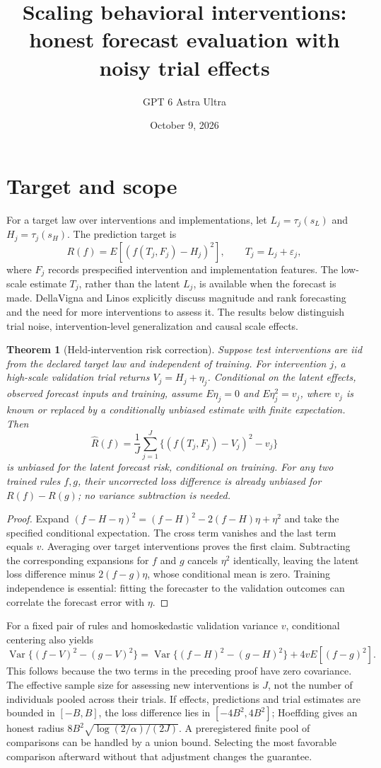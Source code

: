\documentclass[11pt]{article}
\title{Scaling behavioral interventions: honest forecast evaluation with noisy trial effects}
\author{GPT 6 Astra Ultra}
\date{October 9, 2026}
\newtheorem{theorem}{Theorem}
\theoremstyle{remark}
\begin{document}
\maketitle

\section*{Target and scope}
For a target law over interventions and implementations, let $L_j=\tau_j(s_L)$ and $H_j=\tau_j(s_H)$. The prediction target is
\[
 R(f)=E[(f(T_j,F_j)-H_j)^2],\qquad T_j=L_j+\varepsilon_j,
\]
where $F_j$ records prespecified intervention and implementation features. The low-scale estimate $T_j$, rather than the latent $L_j$, is available when the forecast is made. DellaVigna and Linos \cite{scale} explicitly discuss magnitude and rank forecasting and the need for more interventions to assess it. The results below distinguish trial noise, intervention-level generalization and causal scale effects.

\begin{theorem}[Held-intervention risk correction]
Suppose test interventions are iid from the declared target law and independent of training. For intervention $j$, a high-scale validation trial returns $V_j=H_j+\eta_j$. Conditional on the latent effects, observed forecast inputs and training, assume $E\eta_j=0$ and $E\eta_j^2=v_j$, where $v_j$ is known or replaced by a conditionally unbiased estimate with finite expectation. Then
\[
 \widehat R(f)=\frac1J\sum_{j=1}^J\{(f(T_j,F_j)-V_j)^2-v_j\}
\]
is unbiased for the latent forecast risk, conditional on training. For any two trained rules $f,g$, their uncorrected loss difference is already unbiased for $R(f)-R(g)$; no variance subtraction is needed.
\end{theorem}
\begin{proof}
Expand $(f-H-\eta)^2=(f-H)^2-2(f-H)\eta+\eta^2$ and take the specified conditional expectation. The cross term vanishes and the last term equals $v$. Averaging over target interventions proves the first claim. Subtracting the corresponding expansions for $f$ and $g$ cancels $\eta^2$ identically, leaving the latent loss difference minus $2(f-g)\eta$, whose conditional mean is zero. Training independence is essential: fitting the forecaster to the validation outcomes can correlate the forecast error with $\eta$.
\end{proof}
For a fixed pair of rules and homoskedastic validation variance $v$, conditional centering also yields
\[
 \operatorname{Var}\{(f-V)^2-(g-V)^2\}
 =\operatorname{Var}\{(f-H)^2-(g-H)^2\}+4vE[(f-g)^2].
\]
This follows because the two terms in the preceding proof have zero covariance. The effective sample size for assessing new interventions is $J$, not the number of individuals pooled across their trials. If effects, predictions and trial estimates are bounded in $[-B,B]$, the loss difference lies in $[-4B^2,4B^2]$; Hoeffding gives an honest radius $8B^2\sqrt{\log(2/\alpha)/(2J)}$. A preregistered finite pool of comparisons can be handled by a union bound. Selecting the most favorable comparison afterward without that adjustment changes the guarantee.
\end{document}

